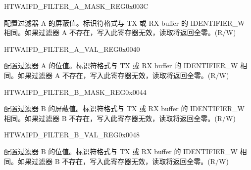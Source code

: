 \begin{register}{H}{TWAIFD\_FILTER\_A\_MASK\_REG}{0x003C}\label{regdesc:TWAIFDFILTERAMASKREG}
%
%
\regnewline%
\begin{regdesc}\begin{reglist}
\label{fielddesc:TWAIFDBITMASKAVAL}\item [TWAIFD\_BIT\_MASK\_A\_VAL] 配置过滤器 A 的屏蔽值。标识符格式与 TX 或 RX buffer 的 IDENTIFIER\_W 相同。如果过滤器 A 不存在，写入此寄存器无效，读取将返回全零。(R/W)
\end{reglist}\end{regdesc}
\end{register}


\begin{register}{H}{TWAIFD\_FILTER\_A\_VAL\_REG}{0x0040}\label{regdesc:TWAIFDFILTERAVALREG}
%
%
\regnewline%
\begin{regdesc}\begin{reglist}
\label{fielddesc:TWAIFDBITVALAVAL}\item [TWAIFD\_BIT\_VAL\_A\_VAL] 配置过滤器 A 的位值。标识符格式与 TX 或 RX buffer 的 IDENTIFIER\_W 相同。如果过滤器 A 不存在，写入此寄存器无效，读取将返回全零。(R/W)
\end{reglist}\end{regdesc}
\end{register}


\begin{register}{H}{TWAIFD\_FILTER\_B\_MASK\_REG}{0x0044}\label{regdesc:TWAIFDFILTERBMASKREG}
%
%
\regnewline%
\begin{regdesc}\begin{reglist}
\label{fielddesc:TWAIFDBITMASKBVAL}\item [TWAIFD\_BIT\_MASK\_B\_VAL] 配置过滤器 B 的屏蔽值。标识符格式与 TX 或 RX buffer 的 IDENTIFIER\_W 相同。如果过滤器 B 不存在，写入此寄存器无效，读取将返回全零。(R/W)
\end{reglist}\end{regdesc}
\end{register}


\begin{register}{H}{TWAIFD\_FILTER\_B\_VAL\_REG}{0x0048}\label{regdesc:TWAIFDFILTERBVALREG}
%
%
\regnewline%
\begin{regdesc}\begin{reglist}
\label{fielddesc:TWAIFDBITVALBVAL}\item [TWAIFD\_BIT\_VAL\_B\_VAL] 配置过滤器 B 的位值。标识符格式与 TX 或 RX buffer 的 IDENTIFIER\_W 相同。如果过滤器 B 不存在，写入此寄存器无效，读取将返回全零。(R/W)
\end{reglist}\end{regdesc}
\end{register}


